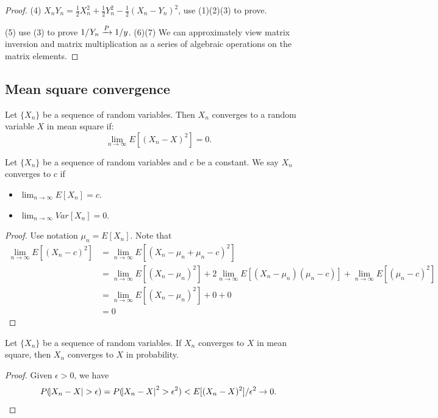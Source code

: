 \begin{refsection}
\begin{proof}
	(4) $X_nY_n = \frac{1}{2}X_n^2 + \frac{1}{2}Y_n^2 - \frac{1}{2}(X_n-Y_n)^2$, use (1)(2)(3) to prove. 
	
	(5) use (3) to prove $1/Y_n \xrightarrow[ ]{P} 1/y$.
	(6)(7) We can approximately view matrix inversion and matrix multiplication as a series of algebraic operations on the matrix elements.
\end{proof}





\subsection{Mean square convergence}
\begin{definition}
Let $\{X_n\}$ be a sequence of random variables. Then $X_n$ converges to a random variable $X$ in mean square if:
$$\lim_{n\rightarrow \infty }E[(X_n - X)^2] = 0.$$
\end{definition}

\begin{theorem}\label{ch:theory-of-probability:th:MeanSquareConvergenceToAConstant}
Let $\{X_n\}$ be a sequence of random variables and $c$ be a constant. We say $X_n$ converges to $c$ if
\begin{itemize}
	\item $\lim_{n\to\infty} E[X_n] = c$.
	\item $\lim_{n\rightarrow \infty }Var[X_n] = 0$.
\end{itemize}		
\end{theorem}
\begin{proof}
Use notation $\mu_n = E[X_n]$. Note that
\begin{align*}
\lim_{n\to\infty} E[(X_n - c)^2] &= \lim_{n\to\infty}E[(X_n - \mu_n + \mu_n - c)^2] \\
			   &= \lim_{n\to\infty} E[(X_n - \mu_n)^2] + 2\lim_{n\to\infty} E[(X_n - \mu_n)(\mu_n-c)] + \lim_{n\to\infty}E[(\mu_n - c)^2] \\
			   &= \lim_{n\to\infty} E[(X_n - \mu_n)^2] + 0 + 0 \\
			   &= 0
\end{align*}
\end{proof}


\begin{theorem}\label{ch:theory-of-probability:th:convergenceMSimpliesconvergeninProb}
Let $\{X_n\}$ be a sequence of random variables. If $X_n$ converges to $X$ in mean square, then $X_n$ converges to $X$ in probability.
\end{theorem}
\begin{proof}
Given $\epsilon > 0$, we have
$$P(\abs{X_n-X} > \epsilon)=P(\abs{X_n-X}^2 > \epsilon^2) < E[(X_n-X)^2]/\epsilon^2 \to 0.$$
\end{proof}


\end{refsection}
